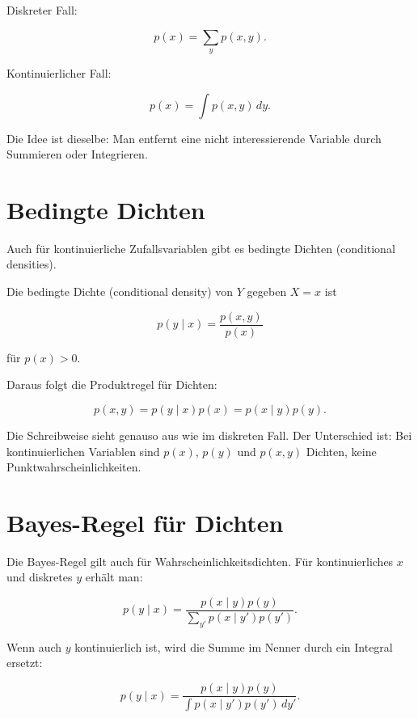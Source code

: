 \begin{conceptbox}
Diskreter Fall:

\[
    p(x)
    =
    \sum_y p(x,y).
\]

Kontinuierlicher Fall:

\[
    p(x)
    =
    \int p(x,y)\,dy.
\]

Die Idee ist dieselbe:
Man entfernt eine nicht interessierende Variable durch Summieren oder Integrieren.
\end{conceptbox}

\section{Bedingte Dichten}

Auch für kontinuierliche Zufallsvariablen gibt es bedingte Dichten (conditional densities).

\begin{definitionbox}
Die bedingte Dichte (conditional density) von \(Y\) gegeben \(X=x\) ist

\[
    p(y \mid x)
    =
    \frac{p(x,y)}{p(x)}
\]

für \(p(x)>0\).
\end{definitionbox}

Daraus folgt die Produktregel für Dichten:

\[
    p(x,y)
    =
    p(y \mid x)p(x)
    =
    p(x \mid y)p(y).
\]

\begin{notebox}
Die Schreibweise sieht genauso aus wie im diskreten Fall.
Der Unterschied ist:
Bei kontinuierlichen Variablen sind \(p(x)\), \(p(y)\) und \(p(x,y)\) Dichten, keine Punktwahrscheinlichkeiten.
\end{notebox}

\section{Bayes-Regel für Dichten}

Die Bayes-Regel gilt auch für Wahrscheinlichkeitsdichten.
Für kontinuierliches \(x\) und diskretes \(y\) erhält man:

\[
    p(y \mid x)
    =
    \frac{
        p(x \mid y)p(y)
    }{
        \sum_{y'} p(x \mid y')p(y')
    }.
\]

Wenn auch \(y\) kontinuierlich ist, wird die Summe im Nenner durch ein Integral ersetzt:

\[
    p(y \mid x)
    =
    \frac{
        p(x \mid y)p(y)
    }{
        \int p(x \mid y')p(y')\,dy'
    }.
\]

